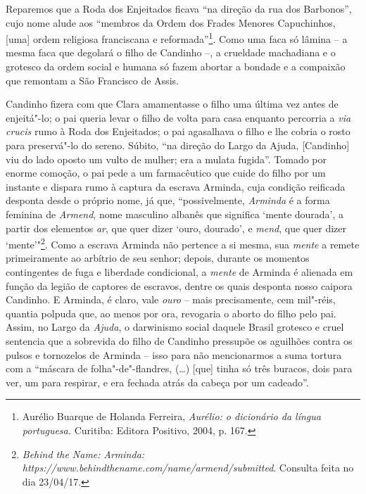 Reparemos que a Roda dos Enjeitados ficava ``na direção da rua dos
Barbonos'', cujo nome alude aos ``membros da Ordem dos Frades Menores
Capuchinhos, {[}uma{]} ordem religiosa franciscana e
reformada''\footnote{Aurélio Buarque de Holanda Ferreira, \emph{Aurélio:
  o dicionário da língua portuguesa.} Curitiba: Editora Positivo, 2004,
  p. 167.}. Como uma faca só lâmina -- a mesma faca que degolará o filho
de Candinho --, a crueldade machadiana e o grotesco da ordem social e
humana só fazem abortar a bondade e a compaixão que remontam a São
Francisco de Assis.

Candinho fizera com que Clara amamentasse o filho uma última vez antes
de enjeitá"-lo; o pai queria levar o filho de volta para casa enquanto
percorria a \emph{via crucis} rumo à Roda dos Enjeitados; o pai
agasalhava o filho e lhe cobria o rosto para preservá"-lo do sereno.
Súbito, ``na direção do Largo da Ajuda, {[}Candinho{]} viu do lado
oposto um vulto de mulher; era a mulata fugida''. Tomado por enorme
comoção, o pai pede a um farmacêutico que cuide do filho por um instante
e dispara rumo à captura da escrava Arminda, cuja condição reificada
desponta desde o próprio nome, já que, ``possivelmente, \emph{Arminda} é
a forma feminina de \emph{Armend}, nome masculino albanês que significa
`mente dourada', a partir dos elementos \emph{ar}, que quer dizer `ouro,
dourado', e \emph{mend}, que quer dizer `mente'"\footnote{\emph{Behind
  the Name:} \emph{Arminda:
  https://www.behindthename.com/name/armend/submitted}.
  Consulta feita no dia 23/04/17.}. Como a escrava Arminda não pertence
a si mesma, sua \emph{mente} a remete primeiramente ao arbítrio de seu
senhor; depois, durante os momentos contingentes de fuga e liberdade
condicional, a \emph{mente} de Arminda é alienada em função da legião de
captores de escravos, dentre os quais desponta nosso caipora Candinho. E
Arminda, é claro, vale \emph{ouro} -- mais precisamente, cem mil"-réis,
quantia polpuda que, ao menos por ora, revogaria o aborto do filho pelo
pai. Assim, no Largo da \emph{Ajuda}, o darwinismo social daquele Brasil
grotesco e cruel sentencia que a sobrevida do filho de Candinho
pressupõe os aguilhões contra os pulsos e tornozelos de Arminda -- isso
para não mencionarmos a suma tortura com a ``máscara de
folha"-de"-flandres, (\ldots{}) [que] tinha só três buracos, dois para ver,
um para respirar, e era fechada atrás da cabeça por um cadeado''.

